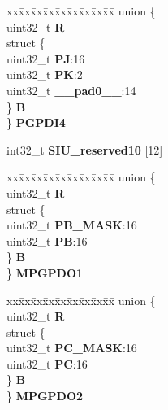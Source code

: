 \begin{DoxyCompactItemize}
\begin{tabbing}
\end{tabbing}\item 
\mbox{\label{structSIU__tag_adf10ec23391be2bb4704a5095814bfc2}} 
\begin{tabbing}
xx\=xx\=xx\=xx\=xx\=xx\=xx\=xx\=xx\=\kill
union \{\\
\>uint32\_t {\bfseries R}\\
\>struct \{\\
\>\>uint32\_t {\bfseries PJ}:16\\
\>\>uint32\_t {\bfseries PK}:2\\
\>\>uint32\_t {\bfseries \_\_pad0\_\_}:14\\
\>\} {\bfseries B}\\
\} {\bfseries PGPDI4}\\

\end{tabbing}\item 
\mbox{\label{structSIU__tag_ad9e96a2643f88d3ca29fcfa648436107}} 
int32\+\_\+t {\bfseries S\+I\+U\+\_\+reserved10} \mbox{[}12\mbox{]}
\item 
\mbox{\label{structSIU__tag_ac03c8150f8da3312580783ec4c952ca7}} 
\begin{tabbing}
xx\=xx\=xx\=xx\=xx\=xx\=xx\=xx\=xx\=\kill
union \{\\
\>uint32\_t {\bfseries R}\\
\>struct \{\\
\>\>uint32\_t {\bfseries PB\_MASK}:16\\
\>\>uint32\_t {\bfseries PB}:16\\
\>\} {\bfseries B}\\
\} {\bfseries MPGPDO1}\\

\end{tabbing}\item 
\mbox{\label{structSIU__tag_a6d4e1f0e66a1dda366baf1036f292560}} 
\begin{tabbing}
xx\=xx\=xx\=xx\=xx\=xx\=xx\=xx\=xx\=\kill
union \{\\
\>uint32\_t {\bfseries R}\\
\>struct \{\\
\>\>uint32\_t {\bfseries PC\_MASK}:16\\
\>\>uint32\_t {\bfseries PC}:16\\
\>\} {\bfseries B}\\
\} {\bfseries MPGPDO2}\\


\end{tabbing}
\end{DoxyCompactItemize}
